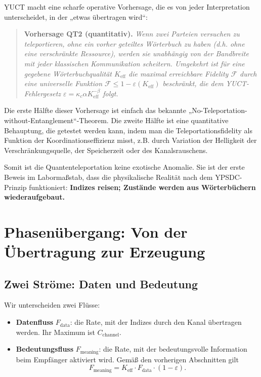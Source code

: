 \documentclass[12pt,a4paper]{article}
\theoremstyle{remark}
\newcommand{\Keff}{K_{\mathrm{eff}}}
\begin{document}
	YUCT macht eine scharfe operative Vorhersage, die es von jeder Interpretation unterscheidet, in der „etwas übertragen wird“:
	
	\begin{quote}
		\textbf{Vorhersage QT2 (quantitativ).} \emph{Wenn zwei Parteien versuchen zu teleportieren, ohne ein vorher geteiltes Wörterbuch zu haben (d.h. ohne eine verschränkte Ressource), werden sie unabhängig von der Bandbreite mit jeder klassischen Kommunikation scheitern. Umgekehrt ist für eine gegebene Wörterbuchqualität $K_{\mathrm{eff}}$ die maximal erreichbare Fidelity $\mathcal{F}$ durch eine universelle Funktion $\mathcal{F} \le 1 - \varepsilon(K_{\mathrm{eff}})$ beschränkt, die dem YUCT-Fehlergesetz $\varepsilon = \kappa_c \alpha K_{\mathrm{eff}}^{-\beta}$ folgt.}
	\end{quote}
	
	Die erste Hälfte dieser Vorhersage ist einfach das bekannte „No-Teleportation-without-Entanglement“-Theorem. Die zweite Hälfte ist eine quantitative Behauptung, die getestet werden kann, indem man die Teleportationsfidelity als Funktion der Koordinationseffizienz misst, z.B. durch Variation der Helligkeit der Verschränkungsquelle, der Speicherzeit oder des Kanalsrauschens.
	
	Somit ist die Quantenteleportation keine exotische Anomalie. Sie ist der erste Beweis im Labormaßstab, dass die physikalische Realität nach dem YPSDC-Prinzip funktioniert: \textbf{Indizes reisen; Zustände werden aus Wörterbüchern wiederaufgebaut.}
	
	\section{Phasenübergang: Von der Übertragung zur Erzeugung}
	\label{sec:transition}
	
	\subsection{Zwei Ströme: Daten und Bedeutung}
	
	Wir unterscheiden zwei Flüsse:
	\begin{itemize}
		\item \textbf{Datenfluss} $F_{\text{data}}$: die Rate, mit der Indizes durch den Kanal übertragen werden. Ihr Maximum ist $C_{\text{channel}}$.
		\item \textbf{Bedeutungsfluss} $F_{\text{meaning}}$: die Rate, mit der bedeutungsvolle Information beim Empfänger aktiviert wird. Gemäß den vorherigen Abschnitten gilt
		\[
		F_{\text{meaning}} = \Keff \cdot F_{\text{data}} \cdot (1 - \varepsilon).
		\]
	\end{itemize}
	
\end{document}
